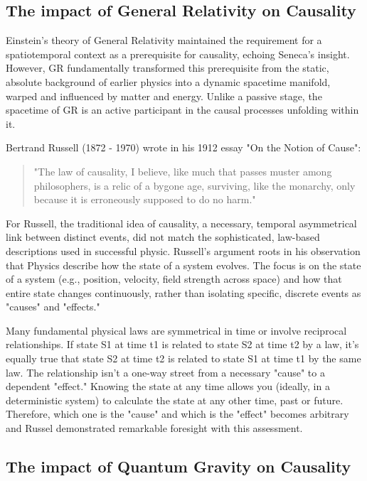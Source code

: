 \newpage

\subsection{The impact of General Relativity on Causality}
\label{subsec:general_relativity_impact}

Einstein’s theory of General Relativity\cite{Einstein_1915Papers} maintained the requirement for a spatiotemporal context as a prerequisite for causality, echoing Seneca's insight. However, GR fundamentally transformed this prerequisite from the static, absolute background of earlier physics into a dynamic spacetime manifold, warped and influenced by matter and energy. Unlike a passive stage, the spacetime of GR is an active participant in the causal processes unfolding within it.

Bertrand Russell (1872 - 1970) wrote in his 1912 essay "On the Notion of Cause"\cite{Russell_Cause1912}:

\begin{quote}
"The law of causality, I believe, like much that passes muster among philosophers, is a relic of a bygone age, surviving, like the monarchy, only because it is erroneously supposed to do no harm." 
\end{quote}


For Russell, the traditional idea of causality, a necessary, temporal asymmetrical link between distinct events, did not match the sophisticated, law-based descriptions used in successful physic. Russell's argument roots in his observation that Physics describe how the state of a system evolves. The focus is on the state of a system (e.g., position, velocity, field strength across space) and how that entire state changes continuously, rather than isolating specific, discrete events as "causes" and "effects." 

Many fundamental physical laws are symmetrical in time or involve reciprocal relationships. If state S1 at time t1 is related to state S2 at time t2 by a law, it's equally true that state S2 at time t2 is related to state S1 at time t1 by the same law. The relationship isn't a one-way street from a necessary "cause" to a dependent "effect." Knowing the state at any time allows you (ideally, in a deterministic system) to calculate the state at any other time, past or future. Therefore, which one is the "cause" and which is the "effect" becomes arbitrary and Russel demonstrated remarkable foresight with this assessment. 

\subsection{The impact of Quantum Gravity on Causality}
\label{subsec:quantum_gravity_impact}

